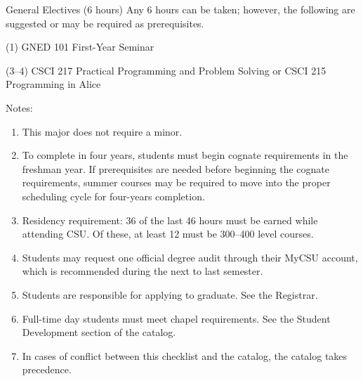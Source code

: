 \begin{reqgroup}{General Electives (6 hours)}
Any 6 hours can be taken; however, the following are suggested or may be required as prerequisites.
\begin{checklist}
\begin{minipage}[t]{\linewidth}
	\item (1)	GNED 101	First-Year Seminar
	\item (3--4)	CSCI 217	Practical Programming and Problem Solving or CSCI 215	Programming in Alice%
		\blankReq
\end{minipage}
\end{checklist}
\end{reqgroup}

Notes:%
\begin{enumerate}\footnotesize
	\item This major does not require a minor.
	\item To complete in four years, students must begin cognate requirements in the freshman year. If prerequisites are needed before beginning the cognate requirements, summer courses may be required to move into the proper scheduling cycle for four-years completion.
	\item Residency requirement: 36 of the last 46 hours must be earned while attending CSU. Of these, at least 12 must be 300--400 level courses.
	\item Students may request one official degree audit through their MyCSU account, which is recommended during the next to last semester.
	\item Students are responsible for applying to graduate. See the Registrar.
	\item Full-time day students must meet chapel requirements. See the Student Development section of the catalog.
	\item In cases of conflict between this checklist and the catalog, the catalog takes precedence.
\end{enumerate}